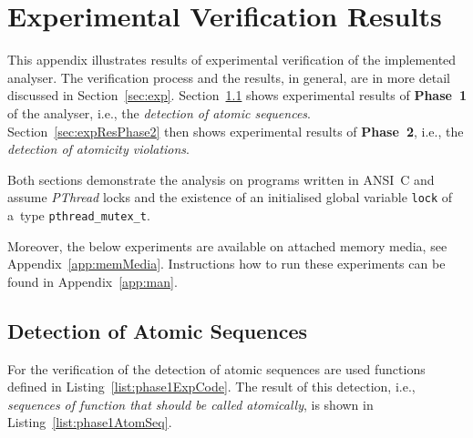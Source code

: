 

\chapter{Experimental Verification Results}
\label{app:expRes}

This appendix illustrates results of experimental verification of
the implemented analyser. The verification process and the results, in
general, are in more detail discussed in Section~\ref{sec:exp}.
Section~\ref{sec:expResPhase1} shows experimental results of
\textbf{Phase~1} of the analyser, i.e., the \emph{detection of atomic
sequences}. Section~\ref{sec:expResPhase2} then shows experimental results
of \textbf{Phase~2}, i.e., the \emph{detection of atomicity violations}.

Both sections demonstrate the analysis on programs written in ANSI~C
and assume \emph{PThread} locks and the existence of an initialised
global variable \texttt{lock} of a~type \texttt{pthread\_mutex\_t}.

Moreover, the below experiments are available on attached memory media,
see Appendix~\ref{app:memMedia}. Instructions how to run these
experiments can be found in Appendix~\ref{app:man}.


\section{Detection of Atomic Sequences}
\label{sec:expResPhase1}

For the verification of the detection of atomic sequences are used
functions defined in Listing~\ref{list:phase1ExpCode}. The result of
this detection, i.e., \emph{sequences of function that should be called
atomically}, is shown in Listing~\ref{list:phase1AtomSeq}.

